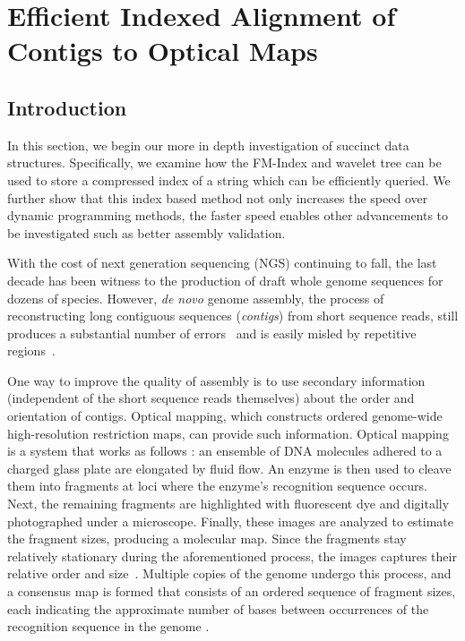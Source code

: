 \documentclass[doctor]{thesis}
\begin{document}
\chapter{Efficient Indexed Alignment of Contigs to Optical Maps}

\makeatletter{}\section{Introduction}



In this section, we begin our more in depth investigation of succinct data structures.  Specifically, we examine how the FM-Index and wavelet tree can be used to store a compressed index of a string which can be efficiently queried.  We further show that this index based method not only increases the speed over dynamic programming methods, the faster speed enables other advancements to be investigated such as better assembly validation.



With the cost of next generation sequencing (NGS) continuing to fall, the last decade
has been witness to the production of draft whole genome sequences for dozens of species.
However, {\em de novo} genome assembly, the process of reconstructing long contiguous sequences 
(\emph{contigs}) from short sequence reads, still produces a substantial number of 
errors~\cite{sequel,Alkan:2011} and is easily misled by repetitive regions~\cite{salzberg}. 

One way to improve the quality of assembly is to use secondary information (independent 
of the short sequence reads themselves) about the order and orientation of contigs.   Optical mapping, which constructs ordered genome-wide high-resolution restriction maps, can provide such information. Optical mapping is a system that works as follows \cite{ORMenc,microfluidic}: an ensemble of DNA molecules adhered to a charged glass plate are elongated by fluid flow.   An enzyme is then used to cleave them into fragments at loci where the enzyme's recognition sequence occurs. Next, the remaining fragments are highlighted with fluorescent dye and digitally photographed under a microscope. Finally, these images are analyzed to estimate the fragment sizes, producing a molecular map. Since the fragments stay relatively stationary during the aforementioned process, the images captures their relative order and size~\cite{Neely11}.   Multiple copies of the genome undergo this process, and a consensus map is formed that consists of an ordered sequence of fragment sizes, each indicating the approximate number of bases between occurrences of the recognition sequence in the genome \cite{Anantharaman01}.  
\end{document}

